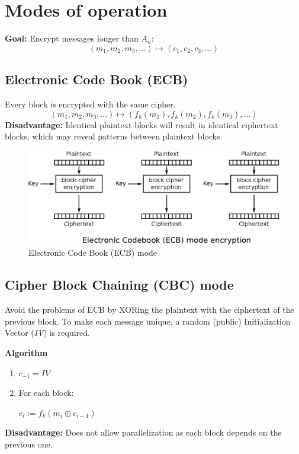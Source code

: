 \documentclass[a4paper]{scrartcl}
\begin{document}
\section{Modes of operation}

\textbf{Goal:} Encrypt messages longer than $A_n$:
\[(m_1,m_2,m_3,\hdots)\mapsto(c_1,c_2,c_3,\hdots)\]

\subsection{Electronic Code Book (ECB)}
Every block is encrypted with the same cipher.
\[(m_1,m_2,m_3,\hdots)\mapsto(f_k(m_1),f_k(m_2),f_k(m_3),\hdots)\]
\textbf{Disadvantage:} Identical plaintext blocks will result in identical
ciphertext blocks, which may reveal patterns between plaintext blocks.

\begin{figure}
    \centering
    \includegraphics[scale=0.7]{images/ecb.eps}
    \caption{Electronic Code Book (ECB) mode}
\end{figure}

\subsection{Cipher Block Chaining (CBC) mode}

Avoid the problems of ECB by XORing the plaintext with the ciphertext of the
previous block. To make each message unique, a random (public) Initialization
Vector (\textit{IV}) is required.

\textbf{Algorithm}
\begin{enumerate}
    \item $c_{-1} = \mathit{IV}$
    \item For each block:

        $c_i := f_k(m_i \oplus c_{i-1})$ 
\end{enumerate}

\textbf{Disadvantage:} Does not allow parallelization as each block depends
on the previous one.
\end{document}
